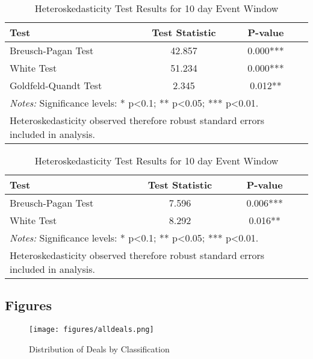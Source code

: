 \documentclass[a4paper]{article}
\begin{document}
\begin{table}[htbp]
    \centering
    \caption{Heteroskedasticity Test Results for 3 day Event Window}
    \label{tab:heteroskedasticity_results3}
    \begin{tabular}{lccc}
        \hline
        \textbf{Test} & \textbf{Test Statistic} & \textbf{P-value} \\
        \hline
        Breusch-Pagan Test & 42.857 & 0.000*** \\
        White Test & 51.234 & 0.000*** \\
        Goldfeld-Quandt Test & 2.345 & 0.012** \\
        \hline
        \multicolumn{3}{p{0.8\textwidth}}{\textit{Notes:} Significance levels: * p<0.1; ** p<0.05; *** p<0.01.} \\
        \multicolumn{3}{p{0.8\textwidth}}{Heteroskedasticity observed therefore robust standard errors included in analysis.} \\
    \end{tabular}
    \bigbreak \bigbreak
    \caption{Heteroskedasticity Test Results for 10 day Event Window}
    \label{tab:heteroskedasticity_results10}
    \begin{tabular}{lccc}
        \hline
        \textbf{Test} & \textbf{Test Statistic} & \textbf{P-value} \\
        \hline
        Breusch-Pagan Test & 7.596 & 0.006*** \\
        White Test & 8.292 & 0.016** \\
        \hline
        \multicolumn{3}{p{0.8\textwidth}}{\textit{Notes:} Significance levels: * p<0.1; ** p<0.05; *** p<0.01.} \\
        \multicolumn{3}{p{0.8\textwidth}}{Heteroskedasticity observed therefore robust standard errors included in analysis.} \\
    \end{tabular}
\end{table}


\newpage
\subsection{Figures}

\begin{figure}[htbp]
    \centering
    \texttt{[image: figures/alldeals.png]}
    \caption{Distribution of Deals by Classification}
    \label{fig:dealdist}
\end{figure}
\end{document}
